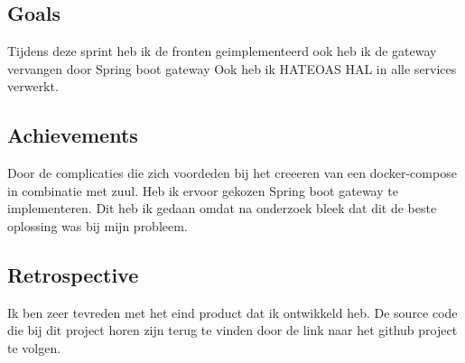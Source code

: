 \documentclass[11pt, twoside]{report}
\begin{document}
    \subsection{Goals}\label{subsec:goals=3}
    Tijdens deze sprint heb ik de fronten geimplementeerd ook heb ik de gateway vervangen door Spring boot gateway
    Ook heb ik HATEOAS HAL in alle services verwerkt.

    \subsection{Achievements}\label{subsec:achievements-3}
    Door de complicaties die zich voordeden bij het creeeren van een docker-compose in combinatie met zuul.
    Heb ik ervoor gekozen Spring boot gateway te implementeren.
    Dit heb ik gedaan omdat na onderzoek bleek dat dit de beste oplossing was bij mijn probleem.

    \subsection{Retrospective}\label{subsec:retrospective-3}
    Ik ben zeer tevreden met het eind product dat ik ontwikkeld heb.
    De source code die bij dit project horen zijn terug te vinden door de link naar het github project te volgen.
\end{document}

